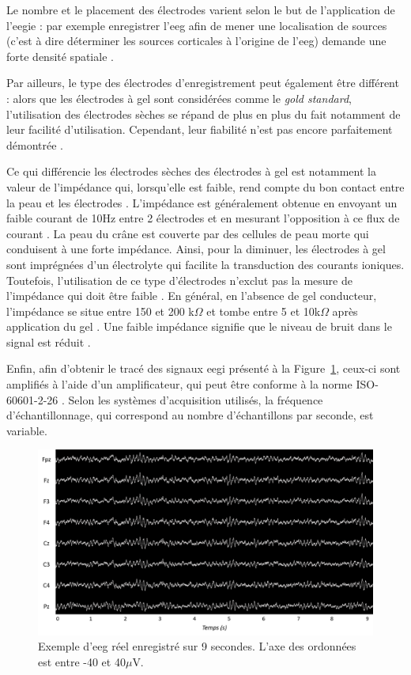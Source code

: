 Le nombre et le placement des électrodes varient selon le but de l'application de l'\gls{eegie} : par exemple enregistrer l'\gls{eeg} afin
de mener une localisation de sources (c'est à dire déterminer les sources corticales à l'origine de l'\gls{eeg}) demande une forte densité spatiale \citep{Lantz2003}. 

Par ailleurs, le type des électrodes d'enregistrement peut également être différent : 
alors que les électrodes à gel sont considérées comme le \textit{gold standard}, l'utilisation des électrodes sèches se répand de plus 
en plus du fait notamment de leur facilité d'utilisation. Cependant, leur fiabilité n'est pas encore parfaitement démontrée \citep{Lopez2014}. 

Ce qui différencie les électrodes sèches des électrodes à gel est notamment la valeur de l'impédance qui, lorsqu'elle est faible, rend compte du bon contact entre la peau et les électrodes \citep{Lopez2014}. 
L'impédance est généralement obtenue en envoyant un faible courant de 10Hz entre 2 électrodes et en mesurant l'opposition à ce flux de courant \citep{Kappenman2010}. La peau du crâne est 
couverte par des cellules de peau morte qui conduisent à une forte impédance.
Ainsi, pour la diminuer, les électrodes à gel sont imprégnées d'un électrolyte qui facilite la transduction des courants ioniques. Toutefois, l'utilisation de ce type d'électrodes 
n'exclut pas la mesure de l'impédance qui doit être faible \citep{Lopez2014}. En général, en l'absence de gel conducteur, l'impédance se
situe entre 150 et 200 k$\Omega$ et tombe entre 5 et 10k$\Omega$ après application du gel \citep{Lopez2014}. Une faible impédance signifie 
que le niveau de bruit dans le signal est réduit \citep{Kappenman2010}.

Enfin, afin d'obtenir le tracé des signaux \gls{eegi} présenté à la Figure~\ref{Figure:introduction_eeg_example}, ceux-ci sont amplifiés 
à l'aide d'un amplificateur, qui peut être conforme à la norme ISO-60601-2-26 \citep{ISO}. Selon les systèmes d'acquisition utilisés, la fréquence
d'échantillonnage, qui correspond au nombre d'échantillons par seconde, est variable.

\begin{figure}[h!]
  \centering
	\includegraphics[width=1\linewidth]{figures/chapter-1/introduction-eeg-example} 
  \caption[Exemple d'\gls{eeg} réel enregistré sur 9 secondes.]{Exemple d'\gls{eeg} réel enregistré sur 9 secondes. L'axe des ordonnées est entre -40 et 40$\mu$V.}
  \label{Figure:introduction_eeg_example}
\end{figure}

